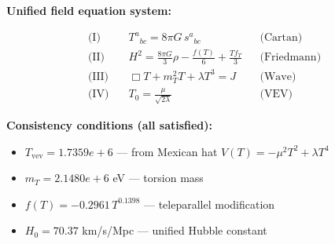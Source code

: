 
\textbf{Unified field equation system:}

\begin{align}
  \text{(I)} \quad & T^a{}_{bc} = 8\pi G \, s^a{}_{bc} && \text{(Cartan)} \\
  \text{(II)} \quad & H^2 = \frac{8\pi G}{3}\rho - \frac{f(T)}{6} + \frac{Tf_T}{3} && \text{(Friedmann)} \\
  \text{(III)} \quad & \Box T + m_T^2 T + \lambda T^3 = J && \text{(Wave)} \\
  \text{(IV)} \quad & T_0 = \frac{\mu}{\sqrt{2\lambda}} && \text{(VEV)}
\end{align}

\textbf{Consistency conditions (all satisfied):}
\begin{itemize}
  \item $T_{\text{vev}} = 1.7359e+6$ — from Mexican hat $V(T) = -\mu^2 T^2 + \lambda T^4$
  \item $m_T = 2.1480e+6$ eV — torsion mass
  \item $f(T) = -0.2961 \, T^{0.1398}$ — teleparallel modification
  \item $H_0 = 70.37$ km/s/Mpc — unified Hubble constant
\end{itemize}